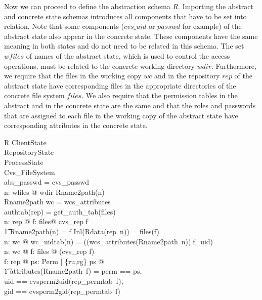 Now we can proceed to define the abstraction schema $R$.  Importing the abstract
and concrete state schemas introduces all components that have to be set into
relation.  Note that some components ($cvs\_uid$ or $passwd$ for example) of the
abstract state also appear in the concrete state.  These components have the
same meaning in both states and do not need to be related in this schema.  The
set $wfiles$ of names of the abstract state, which is used to control the access
operations, must be related to the concrete working directory $wdir$.
Furthermore, we require that the files in the working copy $wc$ and in the
repository $rep$ of the abstract state have corresponding files in the
appropriate directories of the concrete file system $files$.  We also require
that the permission tables in the abstract and in the concrete state are the
same and that the roles and passwords that are assigned to each file in the
working copy of the abstract state have corresponding attributes in the concrete
state.
\begin{schema}{R}
  ClientState \\
  RepositoryState \\
  ProcessState \\
  Cvs\_FileSystem \\
  \where
  abs\_passwd = cvs\_passwd \\

  \forall n: wfiles @ wdir \prefix Rname2path(n) \\
  
  Rname2path \limg \dom wc \rimg = \dom wcs\_attributes \\

  authtab(rep) = get\_auth\_tab(files) \\
  \forall n: \dom rep @ \exists f: \dom files@ cvs\_rep \prefix f \\
  \t1 \land Rname2path(n) = f \land Inl(Rdata(rep~n)) = files(f) \\
  \forall n: \dom wc @ wc\_uidtab(n) = ((wcs\_attributes(Rname2path~n)).f\_uid)  \\
  \forall n: \dom wc @ \exists f: \dom files @ \lnot (cvs\_rep \prefix f) \\
  \forall f: \dom rep @ \exists ps: \power Perm | \{ru,rg\} \subseteq ps @ \\
  \t1 attributes(Rname2path~f) = \lbind \< perm == ps, \\
  uid == cvsperm2uid(rep\_permtab~f), \\
  gid == cvsperm2gid(rep\_permtab~f) \rbind \>
\end{schema}

